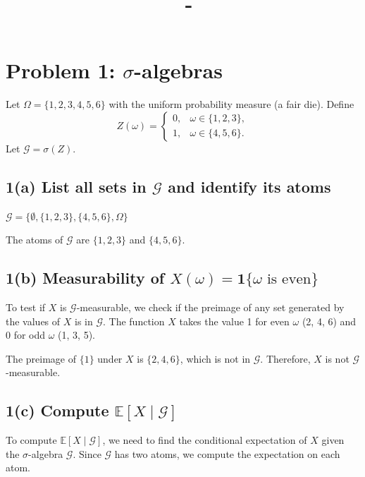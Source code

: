 \documentclass[answers,12pt,addpoints]{exam}
\author{\name}
\title{\course \ - \assignment}
\begin{document}
\maketitle

\section*{Problem 1: \texorpdfstring{$\sigma$}{sigma}-algebras}

Let $\Omega = \{1,2,3,4,5,6\}$ with the uniform probability measure (a fair die). Define
\[
Z(\omega) =
\begin{cases}
0, & \omega \in \{1,2,3\},\\
1, & \omega \in \{4,5,6\}.
\end{cases}
\]
Let $\mathcal{G} = \sigma(Z)$.

\subsection*{1(a) List all sets in \texorpdfstring{$\mathcal{G}$}{G} and identify its atoms}

$\mathcal{G} = \{ \emptyset, \{1,2,3\}, \{4,5,6\}, \Omega \}$

The atoms of $\mathcal{G}$ are $\{1,2,3\}$ and $\{4,5,6\}$.

\subsection*{1(b) Measurability of \texorpdfstring{$X(\omega) = \mathbf{1}\{\omega \text{ is even}\}$}{X}}

To test if $X$ is $\mathcal{G}$-measurable, we check if the preimage of any set generated by the values of $X$ is in $\mathcal{G}$. The function $X$ takes the value 1 for even $\omega$ (2, 4, 6) and 0 for odd $\omega$ (1, 3, 5).

The preimage of $\{1\}$ under $X$ is $\{2,4,6\}$, which is not in $\mathcal{G}$. Therefore, $X$ is not $\mathcal{G}$-measurable.

\subsection*{1(c) Compute \texorpdfstring{$\mathbb{E}[X \mid \mathcal{G}]$}{E[X|G]}}

To compute $\mathbb{E}[X \mid \mathcal{G}]$, we need to find the conditional expectation of $X$ given the $\sigma$-algebra $\mathcal{G}$. Since $\mathcal{G}$ has two atoms, we compute the expectation on each atom.
\end{document}
